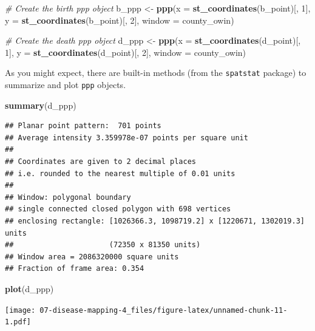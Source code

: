 \documentclass[
]{book}
\newenvironment{Shaded}{\begin{snugshade}}{\end{snugshade}}
\newcommand{\AttributeTok}[1]{\textcolor[rgb]{0.13,0.29,0.53}{#1}}
\newcommand{\CommentTok}[1]{\textcolor[rgb]{0.56,0.35,0.01}{\textit{#1}}}
\newcommand{\DecValTok}[1]{\textcolor[rgb]{0.00,0.00,0.81}{#1}}
\newcommand{\FunctionTok}[1]{\textcolor[rgb]{0.13,0.29,0.53}{\textbf{#1}}}
\newcommand{\NormalTok}[1]{#1}
\newcommand{\OtherTok}[1]{\textcolor[rgb]{0.56,0.35,0.01}{#1}}
\begin{document}
\begin{Shaded}
\begin{Highlighting}[]
\CommentTok{\# Create the birth ppp object}
\NormalTok{b\_ppp }\OtherTok{\textless{}{-}} \FunctionTok{ppp}\NormalTok{(}\AttributeTok{x =} \FunctionTok{st\_coordinates}\NormalTok{(b\_point)[, }\DecValTok{1}\NormalTok{], }
             \AttributeTok{y =} \FunctionTok{st\_coordinates}\NormalTok{(b\_point)[, }\DecValTok{2}\NormalTok{],}
             \AttributeTok{window =}\NormalTok{ county\_owin)}

\CommentTok{\# Create the death ppp object}
\NormalTok{d\_ppp }\OtherTok{\textless{}{-}} \FunctionTok{ppp}\NormalTok{(}\AttributeTok{x =} \FunctionTok{st\_coordinates}\NormalTok{(d\_point)[, }\DecValTok{1}\NormalTok{], }
             \AttributeTok{y =} \FunctionTok{st\_coordinates}\NormalTok{(d\_point)[, }\DecValTok{2}\NormalTok{],}
             \AttributeTok{window =}\NormalTok{ county\_owin)}
\end{Highlighting}
\end{Shaded}

As you might expect, there are built-in methods (from the \texttt{spatstat} package) to summarize and plot \texttt{ppp} objects.

\begin{Shaded}
\begin{Highlighting}[]
\FunctionTok{summary}\NormalTok{(d\_ppp)}
\end{Highlighting}
\end{Shaded}

\begin{verbatim}
## Planar point pattern:  701 points
## Average intensity 3.359978e-07 points per square unit
## 
## Coordinates are given to 2 decimal places
## i.e. rounded to the nearest multiple of 0.01 units
## 
## Window: polygonal boundary
## single connected closed polygon with 698 vertices
## enclosing rectangle: [1026366.3, 1098719.2] x [1220671, 1302019.3] units
##                      (72350 x 81350 units)
## Window area = 2086320000 square units
## Fraction of frame area: 0.354
\end{verbatim}

\begin{Shaded}
\begin{Highlighting}[]
\FunctionTok{plot}\NormalTok{(d\_ppp)}
\end{Highlighting}
\end{Shaded}

\texttt{[image: 07-disease-mapping-4\_files/figure-latex/unnamed-chunk-11-1.pdf]}
\end{document}
